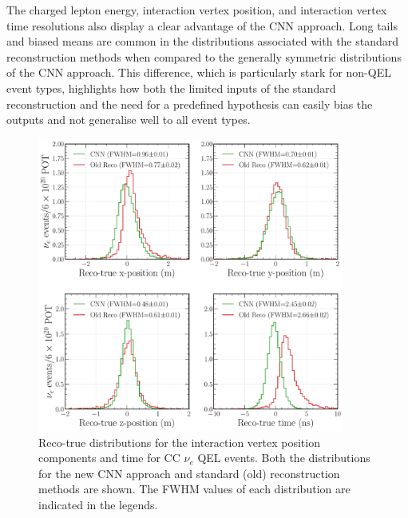 The charged lepton energy, interaction vertex position, and interaction vertex time resolutions
also display a clear advantage of the CNN approach. Long tails and biased means are common in the
distributions associated with the standard reconstruction methods when compared to the generally
symmetric distributions of the CNN approach. This difference, which is particularly stark for
non-QEL event types, highlights how both the limited inputs of the standard reconstruction and the
need for a predefined hypothesis can easily bias the outputs and not generalise well to all event
types.

\begin{figure} %
    \includegraphics[width=0.9\textwidth]{diagrams/7-results/final_vertex_nuel_res_comparison.pdf}
    \caption[Reco-true distributions for the interaction vertex parameters for CC $\nu_{e}$ QEL
        events] {Reco-true distributions for the interaction vertex position components and time
        for CC $\nu_{e}$ QEL events. Both the distributions for the new CNN approach and standard
        (old) reconstruction methods are shown. The FWHM values of each distribution are indicated
        in the legends.}
    \label{fig:final_vertex_nuel_res_comparison}
\end{figure}

